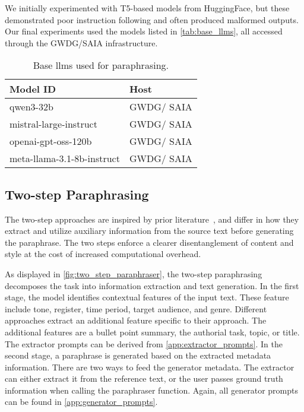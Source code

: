 We initially experimented with T5-based models from HuggingFace, but these demonstrated poor instruction following and often produced malformed outputs. 
Our final experiments used the models listed in \autoref{tab:base_llms}, all accessed through the GWDG/SAIA infrastructure.

\begin{table}[]
\centering
\caption{Base \acp{llm} used for paraphrasing.}
\label{tab:base_llms}
\begin{tabular}{ll}
\toprule
\textbf{Model ID}                    & \textbf{Host} \\
\midrule
qwen3-32b                            & GWDG/ SAIA    \\
mistral-large-instruct               & GWDG/ SAIA    \\
openai-gpt-oss-120b                  & GWDG/ SAIA    \\
meta-llama-3.1-8b-instruct           & GWDG/ SAIA    \\
\bottomrule   
\end{tabular}%
\end{table}


\subsection{Two-step Paraphrasing}

The two-step approaches are inspired by prior literature~\citep{bevendorff_overview_2024, ayele_overview_2024}, and differ in how they extract and utilize auxiliary information from the source text before generating the paraphrase. 
The two steps enforce a clearer disentanglement of content and style at the cost of increased computational overhead.

As displayed in \autoref{fig:two_step_paraphraser}, the two-step paraphrasing decomposes the task into information extraction and text generation. 
In the first stage, the model identifies contextual features of the input text.
These feature include tone, register, time period, target audience, and genre.
Different approaches extract an additional feature specific to their approach.
The additional features are a bullet point summary, the authorial task, topic, or title. 
The extractor prompts can be derived from \autoref{app:extractor_prompts}.
In the second stage, a paraphrase is generated based on the extracted metadata information. 
There are two ways to feed the generator metadata.
The extractor can either extract it from the reference text, or the user passes ground truth information when calling the paraphraser function.
Again, all generator prompts can be found in \autoref{app:generator_prompts}.

